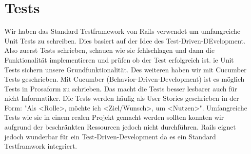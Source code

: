 \section{Tests}
\label{sec:Tests}
Wir haben das Standard Testframework von Rails verwendet um umfangreiche Unit Tests zu schreiben. Dies basiert auf der Idee des Test-Driven-DEvelopment. Also zuerst Tests schrieben, schauen wie sie fehlschlagen und dann die Funktionalität implementieren und prüfen ob der Test erfolgreich ist. ie Unit Tests sichern unsere Grundfunktionalität. Des weiteren haben wir mit Cucumber Tests geschrieben. Mit Cucumber (Behavior-Driven-Development) ist es möglich Tests in Prosaform zu schrieben. Das macht die Tests besser lesbarer auch für nicht Informatiker. Die Tests werden häufig als User Stories geschrieben in der Form: "Als <Rolle>, möchte ich <Ziel/Wunsch>, um <Nutzen>". Umfangreiche Tests wie sie in einem realen Projekt gemacht werden sollten konnten wir aufgrund der beschränkten Ressourcen jedoch nicht durchführen. Rails eignet jedoch wunderbar für ein Test-Driven-Development da es ein Standard Testframwork integriert. 